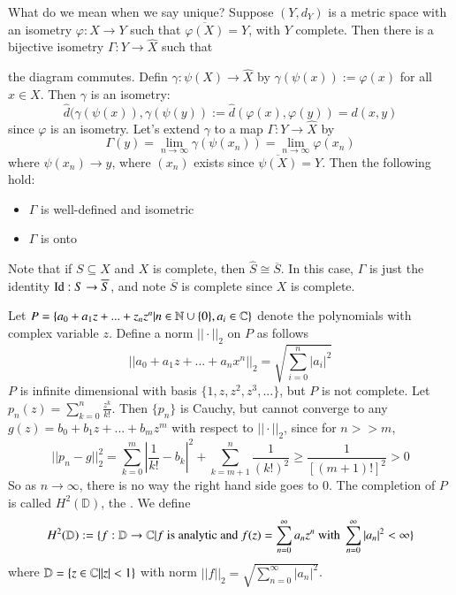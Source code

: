 What do we mean when we say unique? Suppose $(Y,d_Y)$ is a metric space with an isometry $\varphi:X\rightarrow Y$ such that $\overline{\varphi(X)} = Y$, with $Y$ complete. Then there is a bijective isometry $\Gamma:Y\rightarrow \hat{X}$ such that 
\begin{center}
\end{center}
the diagram commutes. Defin $\gamma:\psi(X)\rightarrow \hat{X}$ by $\gamma(\psi(x)) := \varphi(x)$ for all $x \in X$. Then $\gamma$ is an isometry: $$\hat{d}(\gamma(\psi(x)),\gamma(\psi(y)) := \hat{d}(\varphi(x),\varphi(y)) = d(x,y)$$ since $\varphi$ is an isometry. Let's extend $\gamma$ to a map $\Gamma:Y\rightarrow \hat{X}$ by $$\Gamma(y) = \lim\limits_{n\rightarrow \infty}\gamma(\psi(x_n)) = \lim\limits_{n\rightarrow \infty}\varphi(x_n)$$ where $\psi(x_n)\rightarrow y$, where $(x_n)$ exists since $\overline{\psi(X)} = Y$. Then the following hold: \begin{itemize}
    \item $\Gamma$ is well-defined and isometric
    \item $\Gamma$ is onto
\end{itemize}

Note that if $S \subseteq X$ and $X$ is complete, then $\hat{S} \cong \overline{S}$. In this case, $\Gamma$ is just the identity $\operatorname{Id}:S\rightarrow \overline{S}$, and note $\overline{S}$ is complete since $X$ is complete. 

\begin{eg}
    Let $P = \{a_0 +a_1z+...+z_nz^n\vert n \in \mathbb N\cup\{0\},a_i \in \mathbb C\}$ denote the polynomials with complex variable $z$. Define a norm $||\cdot||_2$ on $P$ as follows $$||a_0+a_1z+...+a_nx^n||_2 = \sqrt{\sum_{i=0}^n|a_i|^2}$$ $P$ is infinite dimensional with basis $\{1,z,z^2,z^3,...\}$, but $P$ is not complete. Let $p_n(z) = \sum_{k=0}^n\frac{z^k}{k!}$. Then $\{p_n\}$ is Cauchy, but cannot converge to any $g(z) = b_0+b_1z+...+b_mz^m$ with respect to $||\cdot ||_2$, since for $n >> m$, $$||p_n-g||_2^2 = \sum_{k=0}^m\left|\frac{1}{k!}-b_k\right|^2 + \sum_{k=m+1}^n\frac{1}{(k!)^2} \geq\frac{1}{[(m+1)!]^2} > 0$$ So as $n\rightarrow \infty$, there is no way the right hand side goes to $0$. The completion of $P$ is called $H^2(\mathbb{D})$, the . We define $$H^2(\mathbb{D}) := \{f:\mathbb{D}\rightarrow \mathbb C\vert f\text{ is analytic and }f(z) = \sum_{n=0}^{\infty}a_nz^n\text{ with }\sum_{n=0}^{\infty}|a_n|^2 < \infty\}$$ where $\mathbb{D} = \{z \in \mathbb C\vert |z| < 1\}$ with norm $||f||_2 = \sqrt{\sum_{n=0}^{\infty}|a_n|^2}$.
\end{eg}

